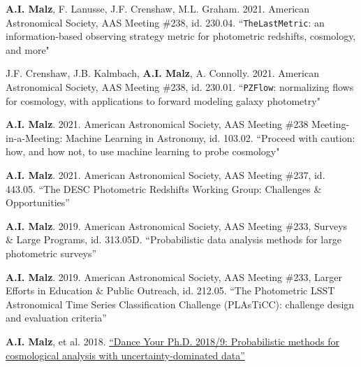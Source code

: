 \clearpage
{}
\nopagebreak\begin{list}{}{\malzlist}
	
	\item {\bf A.I. Malz}, F. Lanusse, J.F. Crenshaw, M.L. Graham. 2021. American Astronomical Society, AAS Meeting \#238, id. 230.04. ``\texttt{TheLastMetric}: an information-based observing strategy metric for photometric redshifts, cosmology, and more"
	
	\item J.F. Crenshaw, J.B. Kalmbach, {\bf A.I. Malz}, A. Connolly. 2021. American Astronomical Society, AAS Meeting \#238, id. 230.01. ``\texttt{PZFlow}: normalizing flows for cosmology, with applications to forward modeling galaxy photometry"
	
	\item {\bf A.I. Malz}. 2021. American Astronomical Society, AAS Meeting \#238 Meeting-in-a-Meeting: Machine Learning in Astronomy, id. 103.02. ``Proceed with caution: how, and how not, to use machine learning to probe cosmology"
	
	\item {\bf A.I. Malz}. 2021. American Astronomical Society, AAS Meeting \#237, id. 443.05. ``The DESC Photometric Redshifts Working Group: Challenges \& Opportunities''
	
	\item {\bf A.I. Malz}. 2019. American Astronomical Society, AAS Meeting \#233, Surveys \& Large Programs, id. 313.05D. ``Probabilistic data analysis methods for large photometric surveys''
	\item {\bf A.I. Malz}. 2019. American Astronomical Society, AAS Meeting \#233, Larger Efforts in Education \& Public Outreach, id. 212.05. ``The Photometric LSST Astronomical Time Series Classification Challenge (PLAsTiCC): challenge design and evaluation criteria”
	
	\item {\bf A.I. Malz}, et al. 2018. \href{https://youtu.be/vKs3PYqZWg8}{``Dance Your Ph.D. 2018/9: Probabilistic methods for cosmological analysis with uncertainty-dominated data''}
	

\end{list}
